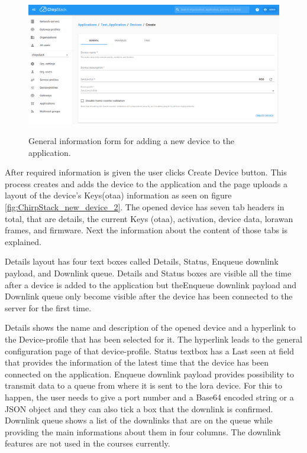 \begin{figure}[ht]
  \centering
  {\includegraphics[width=\textwidth]{illustration/ChirpStack_new_device.png}}
  \caption{General information form for adding a new device to the application.}
  \label{fig:ChirpStack_new_device}
\end{figure}

After required information is given the user clicks Create Device button.
This process creates and adds the device to the application and the page uploads a layout of the device's Keys(\gls{otaa}) information as seen on figure \ref{fig:ChirpStack_new_device_2}. 
The opened device has seven tab headers in total, that are details, the current Keys (\gls{otaa}), activation, device data, \gls{lorawan} frames, and firmware.
Next the information about the content of those tabs is explained.

Details layout has four text boxes called Details, Status, Enqueue downlink payload, and Downlink queue.
Details and Status boxes are visible all the time after a device is added to the application but theEnqueue downlink payload and Downlink queue only become visible after the device has been connected to the server for the first time.

Details shows the name and description of the opened device and a hyperlink to the Device-profile that has been selected for it.
The hyperlink leads to the general configuration page of that device-profile.
Status textbox has a Last seen at field that provides the information of the latest time that the device has been connected on the application.
Enqueue downlink payload provides possibility to transmit data to a queue from where it is sent to the \gls{lora} device. For this to happen, the user needs to give a port number and a Base64 encoded string or a JSON object and they can also tick a box  that the downlink is confirmed.
Downlink queue shows  a list of the downlinks that are on the queue while providing the main informations about them in four columns.
The downlink features are not used in the courses currently.

